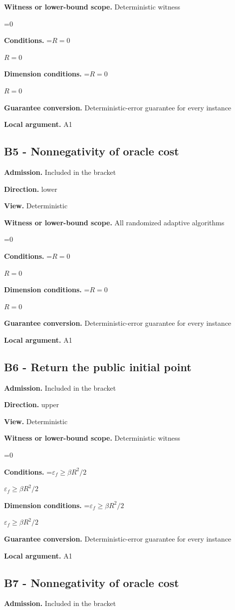 \documentclass[10pt,a4paper]{article}
\newcommand{\AtlasMath}[1]{\par\begingroup\centering\setbox0=\hbox{$\displaystyle #1$}\ifdim\wd0>1.4\linewidth\typeout{ATLAS WIDE FORMULA: \the\wd0}\fi\ifdim\wd0>\linewidth\resizebox{\linewidth}{!}{\box0}\else\box0\fi\par\endgroup}
\newcommand{\AtlasInlineMath}[1]{\begingroup\setbox0=\hbox{$#1$}\ifdim\wd0>.4\linewidth\endgroup\AtlasMath{#1}\else\endgroup$#1$\fi}
\begin{document}
\textbf{Witness or lower-bound scope.} Deterministic witness

\AtlasMath{0}
\textbf{Conditions.} \AtlasInlineMath{R=0}

\textbf{Dimension conditions.} \AtlasInlineMath{R=0}

\textbf{Guarantee conversion.} Deterministic-error guarantee for every instance

\textbf{Local argument.} A1

\subsection{B5 - Nonnegativity of oracle cost}
\textbf{Admission.} Included in the bracket

\textbf{Direction.} lower

\textbf{View.} Deterministic

\textbf{Witness or lower-bound scope.} All randomized adaptive algorithms

\AtlasMath{0}
\textbf{Conditions.} \AtlasInlineMath{R=0}

\textbf{Dimension conditions.} \AtlasInlineMath{R=0}

\textbf{Guarantee conversion.} Deterministic-error guarantee for every instance

\textbf{Local argument.} A1

\subsection{B6 - Return the public initial point}
\textbf{Admission.} Included in the bracket

\textbf{Direction.} upper

\textbf{View.} Deterministic

\textbf{Witness or lower-bound scope.} Deterministic witness

\AtlasMath{0}
\textbf{Conditions.} \AtlasInlineMath{\varepsilon_f\ge\beta R^2/2}

\textbf{Dimension conditions.} \AtlasInlineMath{\varepsilon_f\ge\beta R^2/2}

\textbf{Guarantee conversion.} Deterministic-error guarantee for every instance

\textbf{Local argument.} A1

\subsection{B7 - Nonnegativity of oracle cost}
\textbf{Admission.} Included in the bracket
\end{document}

